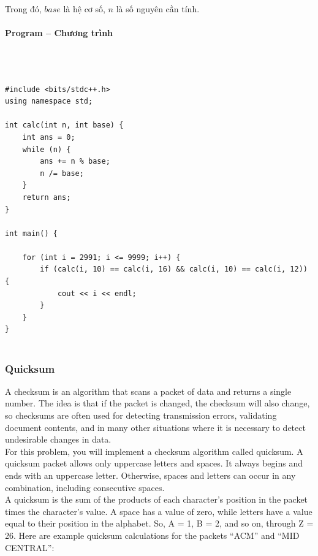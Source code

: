 \documentclass{article}
\begin{document}
Trong đó, $base$ là hệ cơ số, $n$ là số nguyên cần tính.


\paragraph{Program -- Chương trình} \mbox{} \\


\begin{lstlisting}

#include <bits/stdc++.h>
using namespace std;

int calc(int n, int base) {
	int ans = 0;
	while (n) {
		ans += n % base;
		n /= base;
	}
	return ans;
}

int main() {

	for (int i = 2991; i <= 9999; i++) {
		if (calc(i, 10) == calc(i, 16) && calc(i, 10) == calc(i, 12)) {
			cout << i << endl;
		}
	}
}


\end{lstlisting}


\subsubsection{Quicksum}

A checksum is an algorithm that scans a packet of data and returns a single number. The idea
is that if the packet is changed, the checksum will also change, so checksums are often used for
detecting transmission errors, validating document contents, and in many other situations where it is necessary to detect undesirable changes in data. \\

For this problem, you will implement a checksum algorithm called quicksum. A quicksum packet allows only uppercase letters and spaces. It always begins and ends with an uppercase letter. Otherwise, spaces and letters can occur in any combination, including consecutive spaces. \\

A quicksum is the sum of the products of each character’s position in the packet times the character’s value. A space has a value of zero, while letters have a value equal to their position in the alphabet. So, A = 1, B = 2, and so on, through Z = 26. Here are example quicksum calculations
for the packets “ACM” and “MID CENTRAL”: \\
\end{document}

